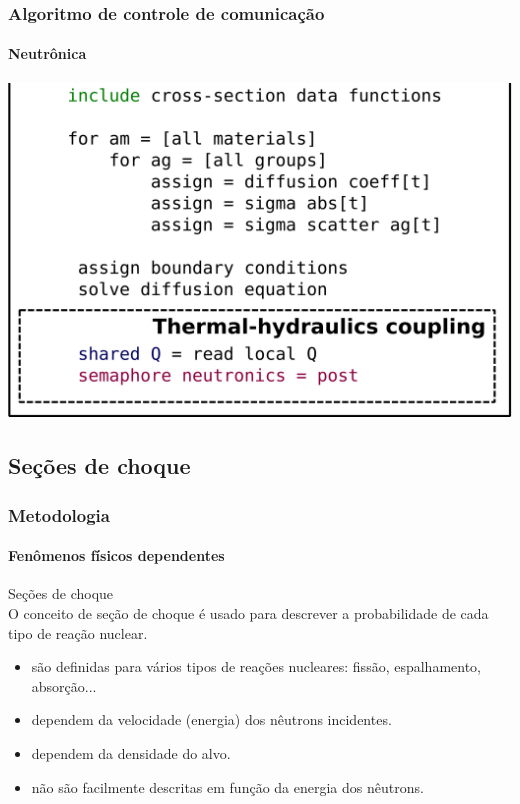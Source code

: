 \documentclass[svgnames,smaller,table]{beamer}
\begin{document}
\begin{frame}
  \frametitle{Algoritmo de controle de comunicação}
  \framesubtitle{Neutrônica}
  \centering\includegraphics[scale=0.4]{../figuras/algo-mil-apre2.png}
\end{frame}

\subsection{Seções de choque}
\begin{frame}
  \frametitle{Metodologia}
  \framesubtitle{Fenômenos físicos dependentes}
  \centering
  \alert{Seções de choque}
  \\
  \vspace{0.5cm}
  O conceito de seção de choque é usado para descrever a probabilidade de cada
  tipo de reação nuclear.
  \\
  \vspace{0.5cm}
  \begin{itemize}
  \item são definidas para vários tipos de reações nucleares: fissão, espalhamento, absorção...
  \item dependem da velocidade (energia) dos nêutrons incidentes.
  \item dependem da densidade do alvo.
  \item \alert{não} são facilmente descritas em função da energia dos nêutrons.
  \end{itemize}
  
\end{frame}
\end{document}
